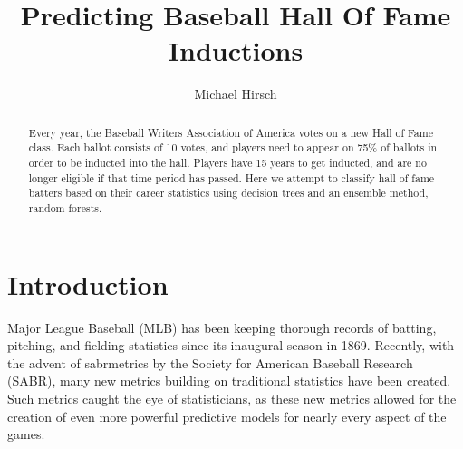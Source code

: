 \documentclass[preprint,12pt]{elsarticle}
\begin{document}
\begin{frontmatter}


\title{Predicting Baseball Hall Of Fame Inductions}




\author{Michael Hirsch}
\address{ILLC, University of Amsterdam}
\address{michaelahirsch@gmail.com}

\begin{abstract}
Every year, the Baseball Writers Association of America votes on a new Hall of Fame class. Each ballot consists of 10 votes, and players need to appear on 75\% of ballots in order to be inducted into the hall. Players have 15 years to get inducted, and are no longer eligible if that time period has passed. Here we attempt to classify hall of fame batters based on their career statistics using decision trees and an ensemble method, random forests.
\end{abstract}


\end{frontmatter}

\section{Introduction}
\label{intro}
Major League Baseball (MLB) has been keeping thorough records of batting, pitching, and fielding statistics since its inaugural season in 1869. Recently, with the advent of sabrmetrics by the Society for American Baseball Research (SABR), many  new metrics building on traditional statistics have been created. Such metrics caught the eye of statisticians, as these new metrics allowed for the creation of even more powerful predictive models for nearly every aspect of the games. 
\end{document}
